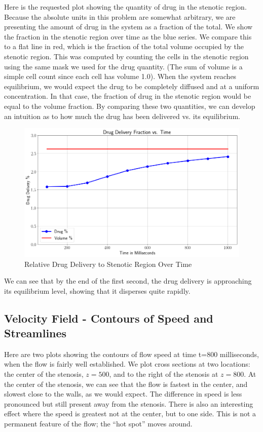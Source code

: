 \documentclass[11pt]{article} %
\begin{document}
Here is the requested plot showing the quantity of drug in the stenotic region.
Because the absolute units in this problem are somewhat arbitrary,
we are presenting the amount of drug in the system as a fraction of the total.
We show the fraction in the stenotic region over time as the blue series.
We compare this to a flat line in red, which is the fraction of the total volume
occupied by the stenotic region.  
This was computed by counting the cells in the stenotic region using the same
mask we used for the drug quantity.  
(The sum of volume is a simple cell count since each cell has volume 1.0).
When the system reaches equilibrium, we would expect the drug to be completely
diffused and at a uniform concentration.  
In that case, the fraction of drug in the stenotic region would be equal to the volume fraction.  
By comparing these two quantities, we can develop an intuition as to how much 
the drug has been delivered vs. its equilibrium.
\begin{figure}
\centering
\includegraphics[width=1.00\textwidth]{drug_frac.png}
\caption{Relative Drug Delivery to Stenotic Region Over Time}
\end{figure}
We can see that by the end of the first second, the drug delivery
is approaching its equilibrium level, showing that it disperses quite rapidly.

\subsection{Velocity Field - Contours of Speed and Streamlines}
Here are two plots showing the contours of flow speed at time t=800 milliseconds, 
when the flow is fairly well established.  
We plot cross sections at two locations: 
the center of the stenosis, $z=500$,
and to the right of the stenosis at $z=800$.
At the center of the stenosis, we can see that the flow is fastest in the center, and slowest close to the walls, as we would expect.
The difference in speed is less pronounced but still present away from the stenosis.
There is also an interesting effect where the speed is greatest not at the center, but to one side.
This is not a permanent feature of the flow; the ``hot spot'' moves around.
\end{document}
